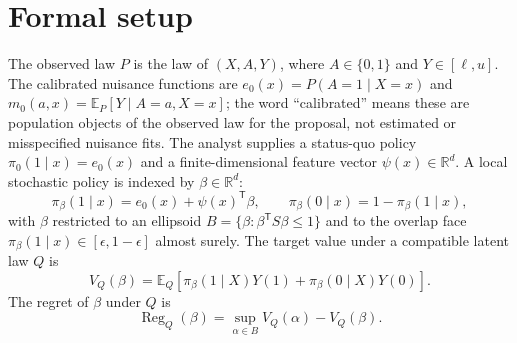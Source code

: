 \documentclass[11pt]{article}
\newcommand{\E}{\mathbb{E}}
\newcommand{\transpose}{\mathsf{T}}
\newcommand{\R}{\mathbb{R}}
\theoremstyle{definition}
\theoremstyle{plain}
\theoremstyle{remark}
\begin{document}
\section{Formal setup}
The observed law $P$ is the law of $(X,A,Y)$, where $A\in\{0,1\}$ and $Y\in[\ell,u]$. The calibrated nuisance functions are
$e_0(x)=P(A=1\mid X=x)$ and $m_0(a,x)=\E_P[Y\mid A=a,X=x]$; the word ``calibrated'' means these are population objects of the observed law for the proposal, not estimated or misspecified nuisance fits. The analyst supplies a status-quo policy $\pi_0(1\mid x)=e_0(x)$ and a finite-dimensional feature vector $\psi(x)\in\R^d$. A local stochastic policy is indexed by $\beta\in\R^d$:
\[
  \pi_\beta(1\mid x)=e_0(x)+\psi(x)^\transpose\beta,\qquad
  \pi_\beta(0\mid x)=1-\pi_\beta(1\mid x),
\]
with $\beta$ restricted to an ellipsoid $B=\{\beta:\beta^\transpose S\beta\le1\}$ and to the overlap face $\pi_\beta(1\mid x)\in[\epsilon,1-\epsilon]$ almost surely. The target value under a compatible latent law $Q$ is
\[
  V_Q(\beta)=\E_Q[\pi_\beta(1\mid X)Y(1)+\pi_\beta(0\mid X)Y(0)].
\]
The regret of $\beta$ under $Q$ is
\[
  \operatorname{Reg}_Q(\beta)=\sup_{\alpha\in B} V_Q(\alpha)-V_Q(\beta).
\]
\end{document}
